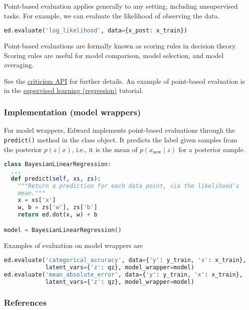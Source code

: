 Point-based evaluation applies generally to any setting, including
unsupervised tasks. For example, we can evaluate the likelihood of
observing the data.
\begin{lstlisting}[language=Python]
ed.evaluate('log_likelihood', data={x_post: x_train})
\end{lstlisting}

Point-based evaluations are formally known as scoring rules
in decision theory. Scoring rules are useful for model comparison, model
selection, and model averaging.

See the \href{/api/criticisms}{criticism API} for further details.
An example of point-based evaluation is in the
\href{/tutorial/supervised-regression}{supervised learning
(regression)} tutorial.

\subsubsection{Implementation (model wrappers)}

For model wrappers, Edward implements point-based evaluations through
the \texttt{predict()} method in the class object. It predicts
the label given samples from the posterior $p(z \mid x)$, i.e., it is
the mean of $p(x_\text{new} \mid z)$ for a posterior sample.
\begin{lstlisting}[language=Python]
class BayesianLinearRegression:
  ...
  def predict(self, xs, zs):
    """Return a prediction for each data point, via the likelihood's
    mean."""
    x = xs['x']
    w, b = zs['w'], zs['b']
    return ed.dot(x, w) + b

model = BayesianLinearRegression()
\end{lstlisting}
Examples of evaluation on model wrappers are
\begin{lstlisting}[language=Python]
ed.evaluate('categorical_accuracy', data={'y': y_train, 'x': x_train},
            latent_vars={'z': qz}, model_wrapper=model)
ed.evaluate('mean_absolute_error', data={'y': y_train, 'x': x_train},
            latent_vars={'z': qz}, model_wrapper=model)
\end{lstlisting}

\subsubsection{References}\label{references}
